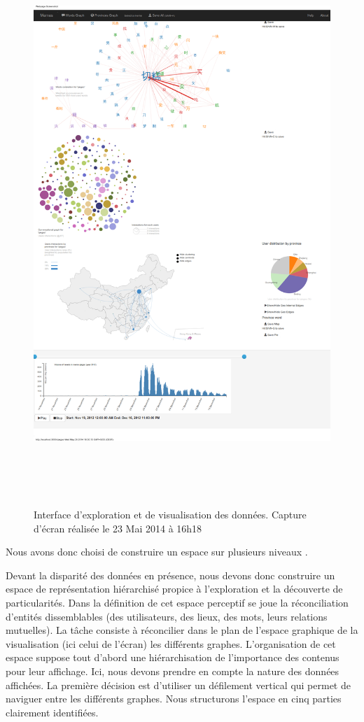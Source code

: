 \begin{figure}
    \label{fig:ui-screenshot}
    \centering
    \includegraphics[width=6.7213in,height=8.3894in]{figures/chap4/ui/ui-screenshot.png}
    \caption{Interface d'exploration et de visualisation des données. Capture d’écran réalisée le 23 Mai 2014 à 16h18}
\end{figure}

Nous avons donc choisi de construire un espace sur plusieurs niveaux .


    Devant la disparité des données en présence, nous devons donc construire un espace de représentation hiérarchisé propice à l{\textquoteright}exploration et la découverte de particularités. Dans la définition de cet espace perceptif se joue la réconciliation d{\textquoteright}entités dissemblables (des utilisateurs, des lieux, des mots, leurs relations mutuelles). La t\^ache consiste à réconcilier dans le plan de l{\textquoteright}espace graphique de la visualisation (ici celui de l{\textquoteright}écran) les différents graphes. L'organisation de cet espace suppose tout d'abord une hiérarchisation de l'importance des contenus pour leur affichage. Ici, nous devons prendre en compte la nature des données affichées. La première décision est d'utiliser un défilement vertical qui permet de naviguer entre les différents graphes. Nous structurons l'espace en cinq parties clairement identifiées.


